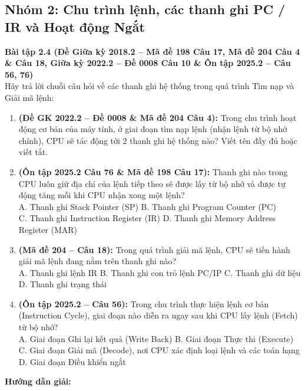 \subsection{Nhóm 2: Chu trình lệnh, các thanh ghi PC / IR và Hoạt động Ngắt}

\textbf{Bài tập 2.4 (Đề Giữa kỳ 2018.2 -- Mã đề 198 Câu 17, Mã đề 204 Câu 4 \& Câu 18, Giữa kỳ 2022.2 -- Đề 0008 Câu 10 \& Ôn tập 2025.2 -- Câu 56, 76)}\\
Hãy trả lời chuỗi câu hỏi về các thanh ghi hệ thống trong quá trình Tìm nạp và Giải mã lệnh:
\begin{enumerate}[label=\alph*)]
    \item \textbf{(Đề GK 2022.2 -- Đề 0008 \& Mã đề 204 Câu 4):} Trong chu trình hoạt động cơ bản của máy tính, ở giai đoạn tìm nạp lệnh (nhận lệnh từ bộ nhớ chính), CPU sẽ tác động tới 2 thanh ghi hệ thống nào? Viết tên đầy đủ hoặc viết tắt.
    \item \textbf{(Ôn tập 2025.2 Câu 76 \& Mã đề 198 Câu 17):} Thanh ghi nào trong CPU luôn giữ địa chỉ của lệnh tiếp theo sẽ được lấy từ bộ nhớ và được tự động tăng mỗi khi CPU nhận xong một lệnh?\\
    A. Thanh ghi Stack Pointer (SP) \quad B. Thanh ghi Program Counter (PC)\\
    C. Thanh ghi Instruction Register (IR) \quad D. Thanh ghi Memory Address Register (MAR)
    \item \textbf{(Mã đề 204 -- Câu 18):} Trong quá trình giải mã lệnh, CPU sẽ tiến hành giải mã lệnh đang nằm trên thanh ghi nào?\\
    A. Thanh ghi lệnh IR \quad B. Thanh ghi con trỏ lệnh PC/IP \quad C. Thanh ghi dữ liệu \quad D. Thanh ghi trạng thái
    \item \textbf{(Ôn tập 2025.2 -- Câu 56):} Trong chu trình thực hiện lệnh cơ bản (Instruction Cycle), giai đoạn nào diễn ra ngay sau khi CPU lấy lệnh (Fetch) từ bộ nhớ?\\
    A. Giai đoạn Ghi lại kết quả (Write Back) \quad B. Giai đoạn Thực thi (Execute)\\
    C. Giai đoạn Giải mã (Decode), nơi CPU xác định loại lệnh và các toán hạng \quad D. Giai đoạn Điều khiển ngắt
\end{enumerate}
\textbf{Hướng dẫn giải:}
